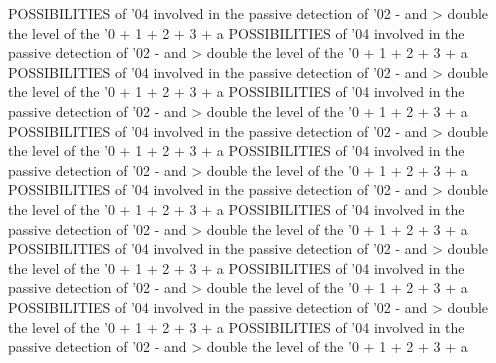 \documentclass{article}%
\begin{document}
{POSSIBILITIES of '04 involved in the passive detection of '02 {-} and > double the level of the '0 + 1 + 2 + 3 + a\newline%
POSSIBILITIES of '04 involved in the passive detection of '02 {-} and > double the level of the '0 + 1 + 2 + 3 + a\newline%
POSSIBILITIES of '04 involved in the passive detection of '02 {-} and > double the level of the '0 + 1 + 2 + 3 + a\newline%
POSSIBILITIES of '04 involved in the passive detection of '02 {-} and > double the level of the '0 + 1 + 2 + 3 + a\newline%
POSSIBILITIES of '04 involved in the passive detection of '02 {-} and > double the level of the '0 + 1 + 2 + 3 + a\newline%
POSSIBILITIES of '04 involved in the passive detection of '02 {-} and > double the level of the '0 + 1 + 2 + 3 + a\newline%
POSSIBILITIES of '04 involved in the passive detection of '02 {-} and > double the level of the '0 + 1 + 2 + 3 + a\newline%
POSSIBILITIES of '04 involved in the passive detection of '02 {-} and > double the level of the '0 + 1 + 2 + 3 + a\newline%
POSSIBILITIES of '04 involved in the passive detection of '02 {-} and > double the level of the '0 + 1 + 2 + 3 + a\newline%
POSSIBILITIES of '04 involved in the passive detection of '02 {-} and > double the level of the '0 + 1 + 2 + 3 + a\newline%
POSSIBILITIES of '04 involved in the passive detection of '02 {-} and > double the level of the '0 + 1 + 2 + 3 + a\newline%
POSSIBILITIES of '04 involved in the passive detection of '02 {-} and > double the level of the '0 + 1 + 2 + 3 + a\newline%
}%
\end{document}
